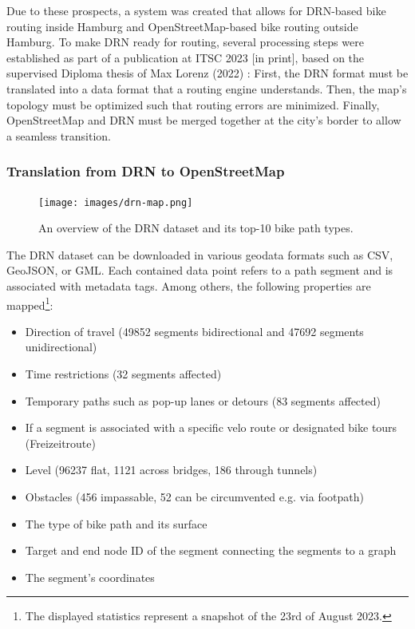 Due to these prospects, a system was created that allows for DRN-based bike routing inside Hamburg and OpenStreetMap-based bike routing outside Hamburg. To make DRN ready for routing, several processing steps were established as part of a publication at ITSC 2023 [in print], based on the supervised Diploma thesis of Max Lorenz (2022) \cite{lorenz_2022}: First, the DRN format must be translated into a data format that a routing engine understands. Then, the map's topology must be optimized such that routing errors are minimized. Finally, OpenStreetMap and DRN must be merged together at the city's border to allow a seamless transition.

\subsubsection{Translation from DRN to OpenStreetMap}

\begin{figure}[htbp]
\centering
\texttt{[image: images/drn-map.png]}
\caption{An overview of the DRN dataset and its top-10 bike path types.}
\label{fig:drn-map}
\end{figure}

The DRN dataset can be downloaded in various geodata formats such as CSV, GeoJSON, or GML. Each contained data point refers to a path segment and is associated with metadata tags. Among others, the following properties are mapped\footnote{The displayed statistics represent a snapshot of the 23rd of August 2023.}:

\begin{itemize}
    \item Direction of travel (49852 segments bidirectional and 47692 segments unidirectional)
    \item Time restrictions (32 segments affected)
    \item Temporary paths such as pop-up lanes or detours (83 segments affected)
    \item If a segment is associated with a specific velo route or designated bike tours (Freizeitroute)
    \item Level (96237 flat, 1121 across bridges, 186 through tunnels)
    \item Obstacles (456 impassable, 52 can be circumvented e.g. via footpath)
    \item The type of bike path and its surface
    \item Target and end node ID of the segment connecting the segments to a graph
    \item The segment's coordinates
\end{itemize}

